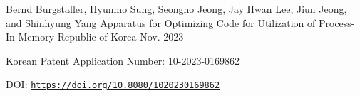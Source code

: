 

\begin{cventries}

  \cventry
    {Bernd Burgstaller, Hyunmo Sung, Seongho Jeong, Jay Hwan Lee, \underline{Jiun Jeong}, and Shinhyung Yang} %
    {Apparatus for Optimizing Code for Utilization of Process-In-Memory} %
    {Republic of Korea} %
    {Nov. 2023} %
    {
      \begin{cvitems} %
        \item {Korean Patent Application Number: 10-2023-0169862}
        \item {DOI: \href{https://doi.org/10.8080/1020230169862}{\texttt{https://doi.org/10.8080/1020230169862}}}
      \end{cvitems}
    }

\end{cventries}
